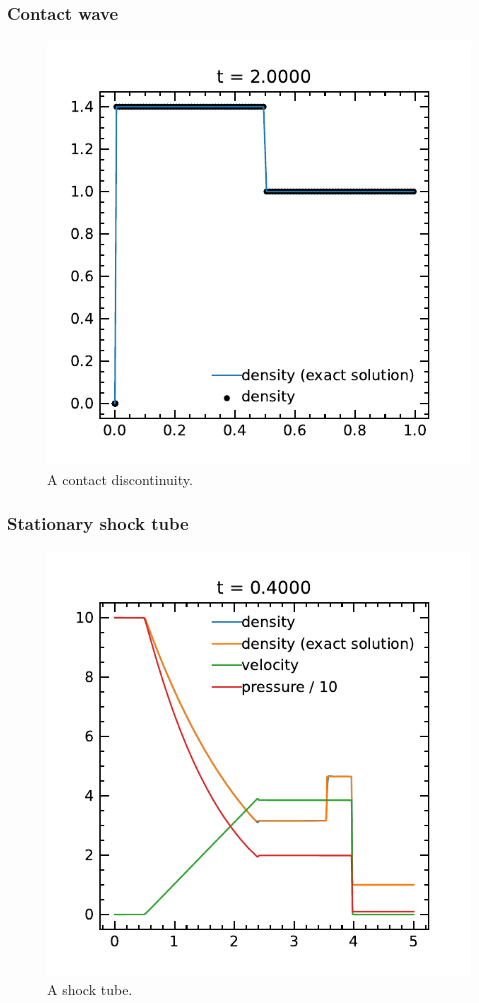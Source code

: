 \documentclass[fleqn,usenatbib]{mnras}
\begin{document}
\subsubsection{Contact wave}
\begin{figure}
    \includegraphics[width=\columnwidth]{hydro_contact.pdf}
    \caption{A contact discontinuity.}
    \label{fig:contact_wave}
\end{figure}
\subsubsection{Stationary shock tube}
\begin{figure}
    \includegraphics[width=\columnwidth]{hydro_shocktube_0.4000.pdf}
    \caption{A shock tube.}
    \label{fig:shocktube}
\end{figure}
\end{document}
